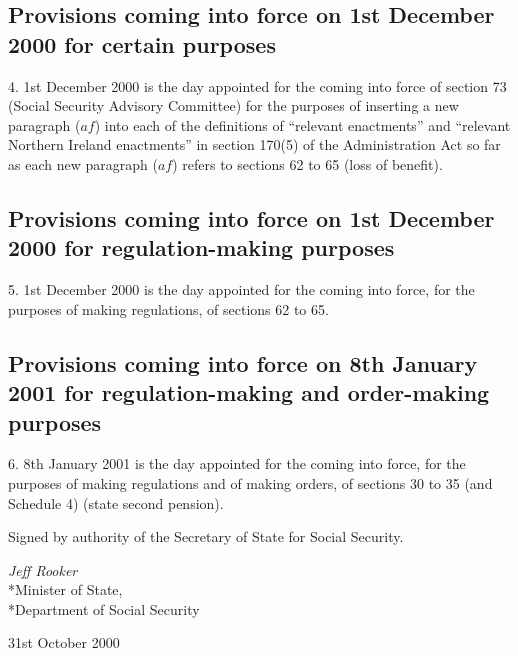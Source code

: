 \documentclass[12pt,a4paper]{article}
\begin{document}
\subsection[4. Provisions coming into force on 1st December 2000 for certain purposes]{Provisions coming into force on 1st December 2000 for certain purposes}

4.  1st December 2000 is the day appointed for the coming into force of section 73 (Social Security Advisory Committee) for the purposes of inserting a new paragraph ($af$)  into each of the definitions of “relevant enactments” and “relevant Northern Ireland enactments” in section 170(5) of the Administration Act so far as each new paragraph ($af$)  refers to sections 62 to 65 (loss of benefit).

\subsection[5. Provisions coming into force on 1st December 2000 for regulation-making purposes]{Provisions coming into force on 1st December 2000 for regulation\hspace{0pt}-making purposes}

5.  1st December 2000 is the day appointed for the coming into force, for the purposes of making regulations, of sections 62 to 65.

\subsection[6. Provisions coming into force on 8th January 2001 for regulation-making and order-making purposes]{Provisions coming into force on 8th January 2001 for regulation\hspace{0pt}-making and order-making purposes}

6.  8th January 2001 is the day appointed for the coming into force, for the purposes of making regulations and of making orders, of sections 30 to 35 (and Schedule 4) (state second pension). 

\bigskip

Signed 
by authority of the Secretary of State for Social Security.

{\raggedleft
\emph{Jeff Rooker}\\*Minister of State,\\*Department of Social Security

}

31st October 2000

\small
\end{document}

